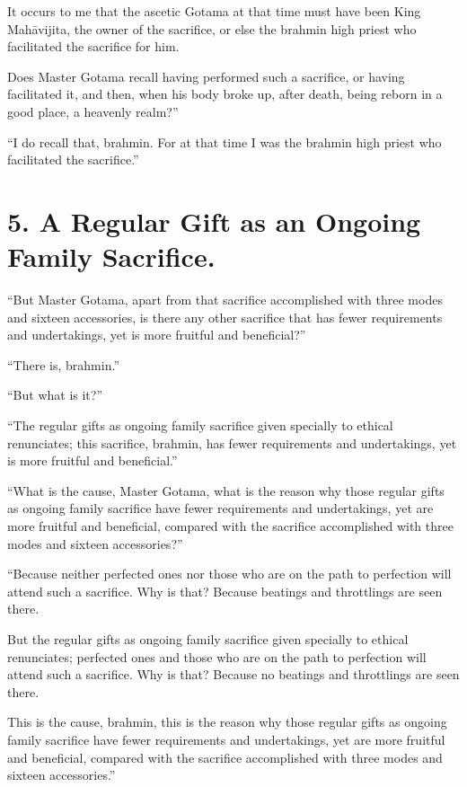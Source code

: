 \documentclass[12pt,openany]{book}%
\begin{document}
It occurs to me that the ascetic Gotama at that time must have been King \textsanskrit{Mahāvijita}, the owner of the sacrifice, or else the brahmin high priest who facilitated the sacrifice for him. 

Does Master Gotama recall having performed such a sacrifice, or having facilitated it, and then, when his body broke up, after death, being reborn in a good place, a heavenly realm?” 

“I do recall that, brahmin. For at that time I was the brahmin high priest who facilitated the sacrifice.” 

\section*{5. A Regular Gift as an Ongoing Family Sacrifice. }

“But Master Gotama, apart from that sacrifice accomplished with three modes and sixteen accessories, is there any other sacrifice that has fewer requirements and undertakings, yet is more fruitful and beneficial?” 

“There is, brahmin.” 

“But what is it?” 

“The regular gifts as ongoing family sacrifice given specially to ethical renunciates; this sacrifice, brahmin, has fewer requirements and undertakings, yet is more fruitful and beneficial.” 

“What is the cause, Master Gotama, what is the reason why those regular gifts as ongoing family sacrifice have fewer requirements and undertakings, yet are more fruitful and beneficial, compared with the sacrifice accomplished with three modes and sixteen accessories?” 

“Because neither perfected ones nor those who are on the path to perfection will attend such a sacrifice. Why is that? Because beatings and throttlings are seen there. 

But the regular gifts as ongoing family sacrifice given specially to ethical renunciates; perfected ones and those who are on the path to perfection will attend such a sacrifice. Why is that? Because no beatings and throttlings are seen there. 

This is the cause, brahmin, this is the reason why those regular gifts as ongoing family sacrifice have fewer requirements and undertakings, yet are more fruitful and beneficial, compared with the sacrifice accomplished with three modes and sixteen accessories.” 
\end{document}
